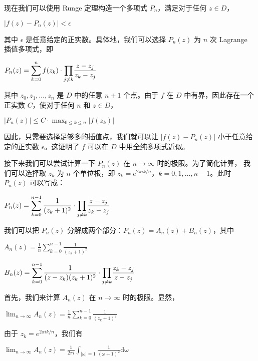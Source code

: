 \documentclass[12pt, a4paper, oneside]{article}
\begin{document}
\begin{spacing}{2.0}
现在我们可以使用 Runge 定理构造一个多项式 $P_n$，满足对于任何 $z \in D$，

\begin{center}
    $|f(z) - P_n(z)|<\epsilon$
\end{center}

其中 $\epsilon$ 是任意给定的正实数。具体地，我们可以选择 $P_n(z)$ 为 $n$ 次 Lagrange 插值多项式，即
\begin{center}
    $P_n(z) = \displaystyle\sum_{k = 0}^{n}f(z_k) \cdot {\textstyle \displaystyle\prod_{j\neq k}}\frac{z - z_j}{z_k - z_j} $
\end{center}
其中 $z_0, z_1, \ldots, z_n$ 是 $D$ 中的任意 $n+1$ 个点。由于 $f$ 在 $D$ 中有界，因此存在一个正实数 $C$，使对于任何 $n$ 和 $z \in D$，
\begin{center}
    $|P_n(z)|\leq C\cdot \displaystyle\max_{0\leq k\leq n}|f(z_k)| $
\end{center}
因此，只需要选择足够多的插值点，我们就可以让 $|f(z) - P_n(z)|$ 小于任意给定的正实数 $\epsilon$。这证明了 $f$ 可以在 $D$ 中用全纯多项式近似。

接下来我们可以尝试计算一下 $P_n(z)$ 在 $n \to \infty$ 时的极限。为了简化计算，
我们可以选择取 $z_k$ 为 $n$ 个单位根，即 $z_k = e^{2 \pi i k/n}$，$k = 0, 1, \ldots, n-1$。此时 $P_n(z)$ 可以写成：
\begin{center}
    $P_n(z) = \displaystyle\sum_{k = 0}^{n-1}\frac{1}{(z_k + 1)^2} \cdot {\textstyle \displaystyle\prod_{j\neq k}}\frac{z - z_j}{z_k - z_j} $
\end{center}
我们可以把 $P_n(z)$ 分解成两个部分：$P_n(z) = A_n(z) + B_n(z)$，其中

\begin{center}
    $A_n(z) = \frac{1}{n}\displaystyle\sum_{k = 0}^{n-1}\frac{1}{(z_k + 1)^2}$
\end{center}

\begin{center}
    $B_n(z) = \displaystyle\sum_{k = 0}^{n-1}\frac{1}{(z - z_k)(z_k + 1)^2}\cdot {\textstyle \displaystyle\prod_{j\neq k}}\frac{z_k - z_j}{z - z_j} $
\end{center}

首先，我们来计算 $A_n(z)$ 在 $n \to \infty$ 时的极限。显然，
\begin{center}
    $\displaystyle\lim_{n\to \infty}A_n(z) = \frac{1}{n}\displaystyle\sum_{k = 0}^{n-1}\frac{1}{(z_k + 1)^2}$
\end{center}
由于 $z_k = e^{2 \pi i k/n}$，我们有
\begin{center}
    $\displaystyle\lim_{n\to \infty}A_n(z) = \frac{1}{2\pi i}\displaystyle\int_{|\omega| = 1}\frac{1}{(\omega + 1)^2}\mathrm{d\omega}$
\end{center}


\end{spacing}
\end{document}
